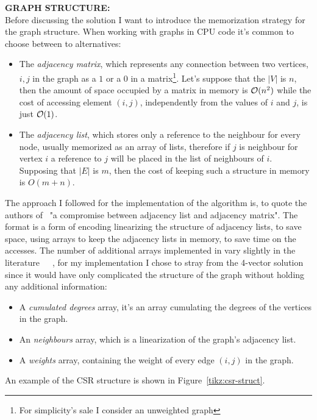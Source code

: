 \documentclass[a4paper,10pt]{article}
\begin{document}
\bigskip
{}
\makeatletter{}\makeatother\label{sec:graph-structure}
\noindent
\textbf{GRAPH STRUCTURE:}
\\
Before discussing the solution I want to introduce the memorization strategy for the graph structure. When working with graphs in CPU code it's common to choose between to alternatives:
\begin{itemize}
	\item The \emph{adjacency matrix}, which represents any connection between two vertices, $i, j$ in the graph as a $1$ or a $0$ in a matrix\footnote{For simplicity's sale I consider an unweighted graph}. Let's suppose that the $|V|$ is $n$, then the amount of space occupied by a matrix in memory is $\mathcal{O}(n^2)$ while the cost of accessing element $(i, j)$, independently from the values of $i$ and $j$, is just $\mathcal{O}(1)$.
	\item The \emph{adjacency list}, which stores only a reference to the neighbour for every node, usually memorized as an array of lists, therefore if $j$ is neighbour for vertex $i$ a reference to $j$ will be placed in the list of neighbours of $i$. Supposing that $|E|$ is $m$, then the cost of keeping such a structure in memory is $O(m + n)$.
\end{itemize}
The approach I followed for the implementation of the algorithm is, to quote the authors of~\cite{generic-he-boruvka} "a compromise between adjacency list and adjacency matrix". The \csr format is a form of encoding linearizing the structure of adjacency lists, to save space, using arrays to keep the adjacency lists in memory, to save time on the accesses. The number of additional arrays implemented in \csr vary slightly in the literature~\cite{csr-kelly}~\cite{csr-wheatman}~\cite{generic-he-boruvka}, for my implementation I chose to stray from the 4-vector solution since it would have only complicated the structure of the graph without holding any additional information:
\begin{itemize}
	\item A \emph{cumulated degrees} array, it's an array cumulating the degrees of the vertices in the graph.
	\item An \emph{neighbours} array, which is a linearization of the graph's adjacency list.
	\item A \emph{weights} array, containing the weight of every edge $(i, j)$ in the graph.
\end{itemize}
An example of the CSR structure is shown in Figure~\ref{tikz:csr-struct}.
\end{document}
